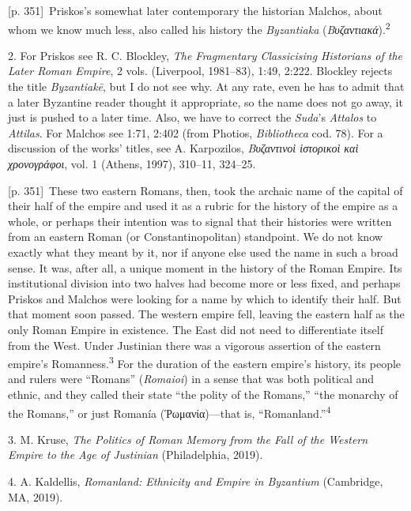 \documentclass[10pt,a4paper]{article}
\begin{document}
{\scriptsize\color{gray}[p. 351]}\ Priskos’s somewhat later contemporary the historian Malchos, about whom we know much less, also called his history the \textit{Byzantiaka }(\textit{Βυζαντιακά}).\nobreak\textsuperscript{2}\par{\small 2.  For Priskos see R. C. Blockley,\textit{ The Fragmentary Classicising Historians of the Later Roman Empire}, 2 vols. (Liverpool, 1981–83), 1:49, 2:222. Blockley rejects the title \textit{Byzantiakē}, but I do not see why. At any rate, even he has to admit that a later Byzantine reader thought it appropriate, so the name does not go away, it just is pushed to a later time. Also, we have to correct the \textit{Suda}’s \textit{Attalos} to \textit{Attilas}. For Malchos see 1:71, 2:402 (from Photios, \textit{Bibliotheca} cod. 78). For a discussion of the works’ titles, see A. Karpozilos, \textit{Βυζαντινοὶ ἱστορικοὶ καὶ χρονογράφοι}, vol. 1 (Athens, 1997), 310–11, 324–25.\par}
{\scriptsize\color{gray}[p. 351]}\ These two eastern Romans, then, took the archaic name of the capital of their half of the empire and used it as a rubric for the history of the empire as a whole, or perhaps their intention was to signal that their histories were written from an eastern Roman (or Constantinopolitan) standpoint. We do not know exactly what they meant by it, nor if anyone else used the name in such a broad sense. It was, after all, a unique moment in the history of the Roman Empire. Its institutional division into two halves had become more or less fixed, and perhaps Priskos and Malchos were looking for a name by which to identify their half. But that moment soon passed. The western empire fell, leaving the eastern half as the only Roman Empire in existence. The East did not need to differentiate itself from the West. Under Justinian there was a vigorous assertion of the eastern empire’s Romanness.\nobreak\textsuperscript{3} For the duration of the eastern empire’s history, its people and rulers were “Romans” (\textit{Romaioi}) in a sense that was both political and ethnic, and they called their state “the polity of the Romans,” “the monarchy of the Romans,” or just Romanía (Ῥωμανία)—that is, “Romanland.”\nobreak\textsuperscript{4}\par{\small 3.  M. Kruse, \textit{The Politics of Roman Memory from the Fall of the Western Empire to the Age of Justinian} (Philadelphia, 2019).\par}{\small 4.  A. Kaldellis, \textit{Romanland: Ethnicity and Empire in Byzantium} (Cambridge, MA, 2019).\par}
\end{document}
